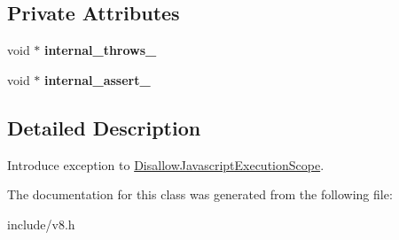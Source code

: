 \subsection*{Private Attributes}
\begin{DoxyCompactItemize}
\item 
void $\ast$ {\bfseries internal\+\_\+throws\+\_\+}\hypertarget{classv8_1_1_isolate_1_1_allow_javascript_execution_scope_a991c6fdbad58aae983e2107de2423f80}{}\label{classv8_1_1_isolate_1_1_allow_javascript_execution_scope_a991c6fdbad58aae983e2107de2423f80}

\item 
void $\ast$ {\bfseries internal\+\_\+assert\+\_\+}\hypertarget{classv8_1_1_isolate_1_1_allow_javascript_execution_scope_a5ef196e5ce1c7c3602b3bbe4674dab3c}{}\label{classv8_1_1_isolate_1_1_allow_javascript_execution_scope_a5ef196e5ce1c7c3602b3bbe4674dab3c}

\end{DoxyCompactItemize}


\subsection{Detailed Description}
Introduce exception to \hyperlink{classv8_1_1_isolate_1_1_disallow_javascript_execution_scope}{Disallow\+Javascript\+Execution\+Scope}. 

The documentation for this class was generated from the following file\+:\begin{DoxyCompactItemize}
\item 
include/v8.\+h\end{DoxyCompactItemize}
